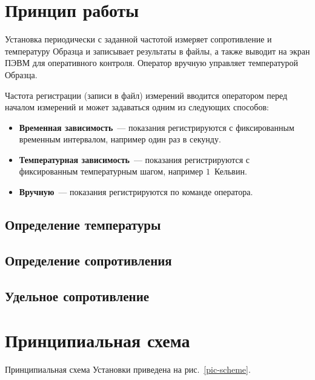 \documentclass[12pt, a4paper, twocolumn]{report}
\begin{document}
\section{Принцип работы}

Установка периодически с заданной частотой измеряет сопротивление и температуру Образца и записывает результаты в файлы, а также выводит на экран ПЭВМ для оперативного контроля. Оператор вручную управляет температурой Образца.

\label{sec_registration_types}

Частота регистрации (записи в файл) измерений вводится оператором перед началом измерений и может задаваться одним из следующих способов:

\begin{itemize}
\item {\bf Временная зависимость}~--- показания регистрируются с фиксированным временным интервалом, например один раз в секунду.
\item {\bf Температурная зависимость}~--- показания регистрируются с фиксированным температурным шагом, например $1$~Кельвин.
\item \label{sec_reg_type_manual} {\bf Вручную}~--- показания регистрируются по команде оператора.
\end{itemize}

\subsection{Определение температуры}



\subsection{Определение сопротивления}



\subsection{Удельное сопротивление}



\section{Принципиальная схема}
\label{sec_schematic_diagram}

Принципиальная схема Установки приведена на рис.~\ref{pic-scheme}.
\end{document}
